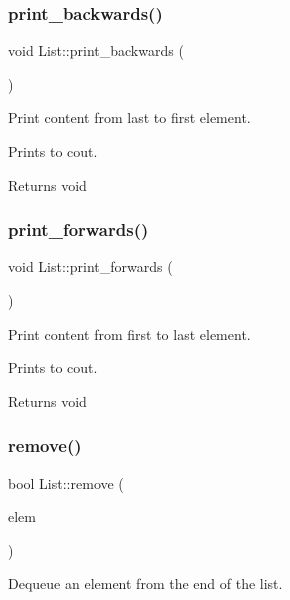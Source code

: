 \subsubsection{\texorpdfstring{print\+\_\+backwards()}{print\_backwards()}}
{\footnotesize\ttfamily void List\+::print\+\_\+backwards (\begin{DoxyParamCaption}{ }\end{DoxyParamCaption})}



Print content from last to first element. 

Prints to cout.

\begin{DoxyReturn}{Returns}
void 
\end{DoxyReturn}
\mbox{\label{class_list_a9cd9aa3b710f2c17acbc41a9c376f337}} 
\subsubsection{\texorpdfstring{print\+\_\+forwards()}{print\_forwards()}}
{\footnotesize\ttfamily void List\+::print\+\_\+forwards (\begin{DoxyParamCaption}{ }\end{DoxyParamCaption})}



Print content from first to last element. 

Prints to cout.

\begin{DoxyReturn}{Returns}
void 
\end{DoxyReturn}
\mbox{\label{class_list_a3cd4941e2836482d8155a2b61e0f3356}} 
\subsubsection{\texorpdfstring{remove()}{remove()}}
{\footnotesize\ttfamily bool List\+::remove (\begin{DoxyParamCaption}\item[{\hyperlink{class_list_elem}{List\+Elem} $\ast$}]{elem }\end{DoxyParamCaption})}



Dequeue an element from the end of the list. 

